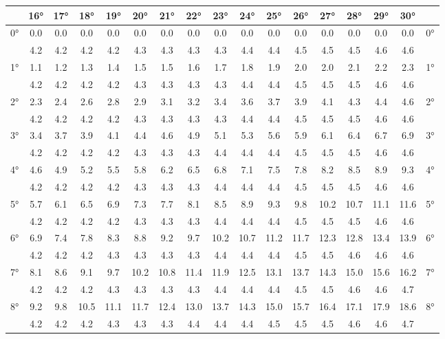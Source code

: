 \begin{footnotesize}\begin{tabular}{c || c | c | c | c | c | c | c | c | c | c | c | c | c | c | c || c}
		\space &16°&17°&18°&19°&20°&21°&22°&23°&24°&25°&26°&27°&28°&29°&30°\\\hline\hline
		\multirow{2}{*}{0°}&0.0&0.0&0.0&0.0&0.0&0.0&0.0&0.0&0.0&0.0&0.0&0.0&0.0&0.0&0.0&\multirow{2}{*}{0°}\\ \space&4.2&4.2&4.2&4.2&4.3&4.3&4.3&4.3&4.4&4.4&4.5&4.5&4.5&4.6&4.6&\space\\\hline
		\multirow{2}{*}{1°}&1.1&1.2&1.3&1.4&1.5&1.5&1.6&1.7&1.8&1.9&2.0&2.0&2.1&2.2&2.3&\multirow{2}{*}{1°}\\ \space&4.2&4.2&4.2&4.2&4.3&4.3&4.3&4.3&4.4&4.4&4.5&4.5&4.5&4.6&4.6&\space\\\hline
		\multirow{2}{*}{2°}&2.3&2.4&2.6&2.8&2.9&3.1&3.2&3.4&3.6&3.7&3.9&4.1&4.3&4.4&4.6&\multirow{2}{*}{2°}\\ \space&4.2&4.2&4.2&4.2&4.3&4.3&4.3&4.3&4.4&4.4&4.5&4.5&4.5&4.6&4.6&\space\\\hline
		\multirow{2}{*}{3°}&3.4&3.7&3.9&4.1&4.4&4.6&4.9&5.1&5.3&5.6&5.9&6.1&6.4&6.7&6.9&\multirow{2}{*}{3°}\\ \space&4.2&4.2&4.2&4.2&4.3&4.3&4.3&4.4&4.4&4.4&4.5&4.5&4.5&4.6&4.6&\space\\\hline
		\multirow{2}{*}{4°}&4.6&4.9&5.2&5.5&5.8&6.2&6.5&6.8&7.1&7.5&7.8&8.2&8.5&8.9&9.3&\multirow{2}{*}{4°}\\ \space&4.2&4.2&4.2&4.2&4.3&4.3&4.3&4.4&4.4&4.4&4.5&4.5&4.5&4.6&4.6&\space\\\hline
		\multirow{2}{*}{5°}&5.7&6.1&6.5&6.9&7.3&7.7&8.1&8.5&8.9&9.3&9.8&10.2&10.7&11.1&11.6&\multirow{2}{*}{5°}\\ \space&4.2&4.2&4.2&4.2&4.3&4.3&4.3&4.4&4.4&4.4&4.5&4.5&4.5&4.6&4.6&\space\\\hline
		\multirow{2}{*}{6°}&6.9&7.4&7.8&8.3&8.8&9.2&9.7&10.2&10.7&11.2&11.7&12.3&12.8&13.4&13.9&\multirow{2}{*}{6°}\\ \space&4.2&4.2&4.2&4.3&4.3&4.3&4.3&4.4&4.4&4.4&4.5&4.5&4.6&4.6&4.6&\space\\\hline
		\multirow{2}{*}{7°}&8.1&8.6&9.1&9.7&10.2&10.8&11.4&11.9&12.5&13.1&13.7&14.3&15.0&15.6&16.2&\multirow{2}{*}{7°}\\ \space&4.2&4.2&4.2&4.3&4.3&4.3&4.3&4.4&4.4&4.4&4.5&4.5&4.6&4.6&4.7&\space\\\hline
		\multirow{2}{*}{8°}&9.2&9.8&10.5&11.1&11.7&12.4&13.0&13.7&14.3&15.0&15.7&16.4&17.1&17.9&18.6&\multirow{2}{*}{8°}\\ \space&4.2&4.2&4.2&4.3&4.3&4.3&4.4&4.4&4.4&4.5&4.5&4.5&4.6&4.6&4.7&\space\\\hline

\end{tabular}
\end{footnotesize}
